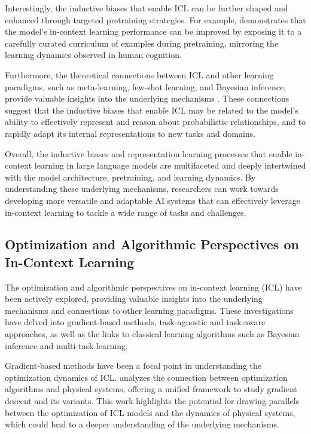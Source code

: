 \documentclass[11pt]{article}
\begin{document}
Interestingly, the inductive biases that enable ICL can be further shaped and enhanced through targeted pretraining strategies. For example, \cite{ref39} demonstrates that the model's in-context learning performance can be improved by exposing it to a carefully curated curriculum of examples during pretraining, mirroring the learning dynamics observed in human cognition.

Furthermore, the theoretical connections between ICL and other learning paradigms, such as meta-learning, few-shot learning, and Bayesian inference, provide valuable insights into the underlying mechanisms \cite{ref40,ref41}. These connections suggest that the inductive biases that enable ICL may be related to the model's ability to effectively represent and reason about probabilistic relationships, and to rapidly adapt its internal representations to new tasks and domains.

Overall, the inductive biases and representation learning processes that enable in-context learning in large language models are multifaceted and deeply intertwined with the model architecture, pretraining, and learning dynamics. By understanding these underlying mechanisms, researchers can work towards developing more versatile and adaptable AI systems that can effectively leverage in-context learning to tackle a wide range of tasks and challenges.

\subsection{Optimization and Algorithmic Perspectives on In-Context Learning}

The optimization and algorithmic perspectives on in-context learning (ICL) have been actively explored, providing valuable insights into the underlying mechanisms and connections to other learning paradigms. These investigations have delved into gradient-based methods, task-agnostic and task-aware approaches, as well as the links to classical learning algorithms such as Bayesian inference and multi-task learning.

Gradient-based methods have been a focal point in understanding the optimization dynamics of ICL. \cite{ref42} analyzes the connection between optimization algorithms and physical systems, offering a unified framework to study gradient descent and its variants. This work highlights the potential for drawing parallels between the optimization of ICL models and the dynamics of physical systems, which could lead to a deeper understanding of the underlying mechanisms.
\end{document}
